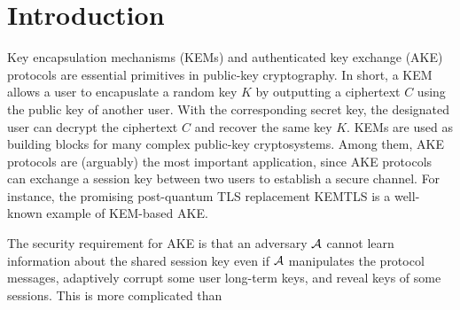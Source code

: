 
\section{Introduction}
Key encapsulation mechanisms (KEMs) and authenticated key exchange (AKE) protocols are essential primitives in public-key cryptography.
In short, a KEM allows a user to encapuslate a random key $K$ by outputting a ciphertext $C$ using the public key of another user. 
With the corresponding secret key, the designated user can decrypt the ciphertext \(C\) and recover the same key $K$.
KEMs are used as building blocks for many complex public-key cryptosystems. Among them, AKE protocols are (arguably) the most important application, since AKE protocols can exchange a session key between two users to establish a secure channel.
For instance, the promising post-quantum TLS replacement KEMTLS \cite{CCS:SchSteWig20} is a well-known example of KEM-based AKE.


The security requirement for AKE is that an adversary $\mathcal{A}$ cannot learn information about the shared session key even if $\mathcal{A}$ manipulates the protocol messages, adaptively corrupt some user long-term keys, and reveal keys of some sessions. This is more complicated than 

